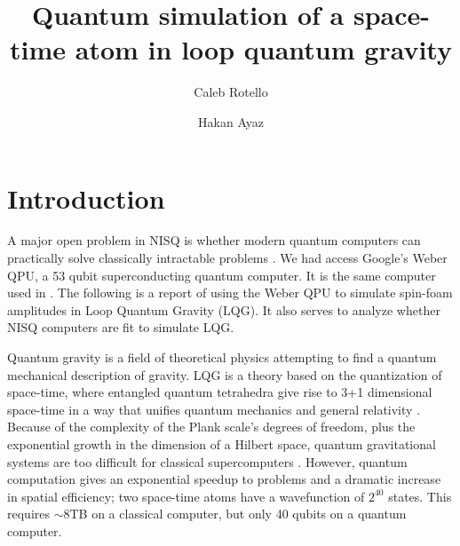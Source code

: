 \documentclass[a4paper,11pt,aps,tightenlines,nofootinbib]{revtex4}
\begin{document}
\title{Quantum simulation of a space-time atom in loop quantum gravity}
\author{Caleb Rotello}
\author{Hakan Ayaz}

\begin{abstract}
\end{abstract}


\maketitle


\section{Introduction}

%
%

A major open problem in NISQ is whether modern quantum computers can practically solve classically intractable problems \cite{nisq}.
We had access Google's Weber QPU, a 53 qubit superconducting quantum computer. It is the same computer used in \cite{supremacy}. 
The following is a report of using the Weber QPU to simulate spin-foam amplitudes in Loop Quantum Gravity (LQG). It also serves to 
analyze whether NISQ computers are fit to simulate LQG.

Quantum gravity is a field of theoretical physics attempting to find a quantum mechanical description of gravity.
LQG is a theory based on the quantization of space-time, where entangled quantum tetrahedra give rise to 3+1 dimensional space-time in a way that 
unifies quantum mechanics and general relativity \cite{ashketar}. Because of the complexity of the Plank scale's degrees of freedom, plus the exponential
growth in the dimension of a Hilbert space, quantum gravitational systems are too difficult for classical supercomputers \cite{ibm-qsim-qubit-of-space}. 
However, quantum computation gives an exponential speedup to problems and a dramatic increase in spatial efficiency; two space-time atoms have a wavefunction of 
$2^{40}$ states. This requires $\sim 8$TB on a classical computer, but only 40 qubits on a quantum computer.
\end{document}
